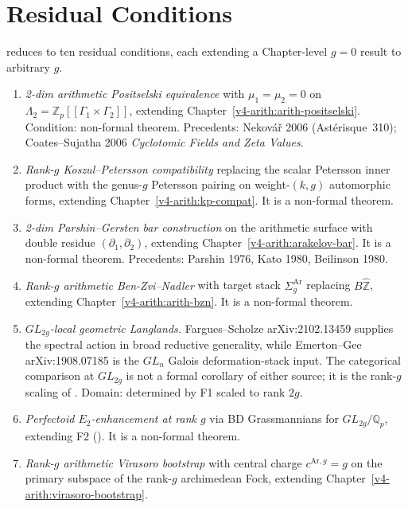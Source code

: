 \section{Residual Conditions}
\label{v4-arith:ag:residual}

 reduces to ten residual conditions,
each extending a Chapter-level \(g=0\) result to arbitrary \(g\).

\begin{enumerate}
\item \emph{2-dim arithmetic Positselski equivalence} with
\(\mu_1=\mu_2=0\) on \(\Lambda_2=\mathbb{Z}_p[[\Gamma_1\times\Gamma_2]]\),
extending Chapter~\ref{v4-arith:arith-positselski}. Condition: non-formal theorem. Precedents: Nekov\'a\v{r} 2006 (Astérisque~310); Coates--Sujatha
2006 \emph{Cyclotomic Fields and Zeta Values}.
\item \emph{Rank-\(g\) Koszul--Petersson compatibility} replacing the
scalar Petersson inner product with the genus-\(g\) Petersson pairing on
weight-\((k,g)\) automorphic forms, extending Chapter~\ref{v4-arith:kp-compat}.
It is a non-formal theorem.
\item \emph{2-dim Parshin--Gersten bar construction} on the arithmetic
surface with double residue \((\partial_1,\partial_2)\), extending
Chapter~\ref{v4-arith:arakelov-bar}. It is a non-formal theorem. Precedents:
Parshin 1976, Kato 1980, Beilinson 1980.
\item \emph{Rank-\(g\) arithmetic Ben-Zvi--Nadler} with target stack
\(\Sigma_g^{\mathrm{Ar}}\) replacing \(B\widehat{\mathbb{Z}}\), extending
Chapter~\ref{v4-arith:arith-bzn}. It is a non-formal theorem.
\item \emph{\(GL_{2g}\)-local geometric Langlands.} Fargues--Scholze
arXiv:2102.13459 supplies the spectral action in broad reductive
generality, while Emerton--Gee arXiv:1908.07185 is the \(GL_n\) Galois
deformation-stack input. The categorical comparison at \(GL_{2g}\) is
not a formal corollary of either source; it is the rank-\(g\) scaling of
. Domain: determined by F1 scaled to
rank \(2g\).
\item \emph{Perfectoid \(E_2\)-enhancement at rank \(g\)} via BD
Grassmannians for \(GL_{2g}/\mathbb{Q}_p\), extending F2
(). It is a non-formal theorem.
\item \emph{Rank-\(g\) arithmetic Virasoro bootstrap} with central
charge \(c^{\mathrm{Ar},g}=g\) on the primary subspace of the rank-\(g\)
archimedean Fock, extending Chapter~\ref{v4-arith:virasoro-bootstrap}.

\end{enumerate}
